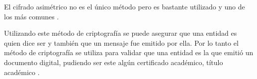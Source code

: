 El cifrado asimétrico no es el único método pero es bastante utilizado y uno de los más comunes \cite[]{crypto_sheinix_bitcoin_2020}.  

Utilizando este método de criptografía se puede asegurar que una entidad es quien dice ser y también que un mensaje fue
emitido por ella. Por lo tanto el método de criptografía se utiliza para validar que una entidad es la que emitió un documento digital,
pudiendo ser este algún certificado académico,  título  académico \cite[]{garcia_rojas_implementacion_2008,avila_implementacion_2015,crypto_sheinix_bitcoin_2020}. 
